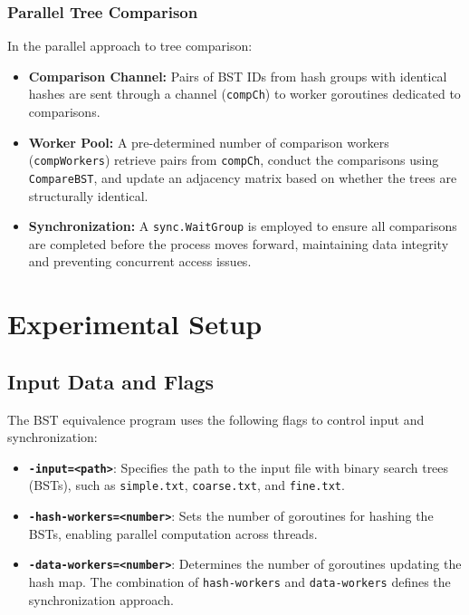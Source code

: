 \documentclass[letterpaper,12pt]{article}
\theoremstyle{remark}
\begin{document}
\subsubsection{Parallel Tree Comparison}
In the parallel approach to tree comparison:
\begin{itemize}
    \item \textbf{Comparison Channel:} Pairs of BST IDs from hash groups with identical hashes are sent through a channel (\texttt{compCh}) to worker goroutines dedicated to comparisons.
    \item \textbf{Worker Pool:} A pre-determined number of comparison workers (\texttt{compWorkers}) retrieve pairs from \texttt{compCh}, conduct the comparisons using \texttt{CompareBST}, and update an adjacency matrix based on whether the trees are structurally identical.
    \item \textbf{Synchronization:} A \texttt{sync.WaitGroup} is employed to ensure all comparisons are completed before the process moves forward, maintaining data integrity and preventing concurrent access issues.

\end{itemize}





\section*{Experimental Setup}
\subsection{Input Data and Flags}
The BST equivalence program uses the following flags to control input and synchronization:

\begin{itemize}
    \item \textbf{\texttt{-input=<path>}}: Specifies the path to the input file with binary search trees (BSTs), such as \texttt{simple.txt}, \texttt{coarse.txt}, and \texttt{fine.txt}.
    
    \item \textbf{\texttt{-hash-workers=<number>}}: Sets the number of goroutines for hashing the BSTs, enabling parallel computation across threads.

    \item \textbf{\texttt{-data-workers=<number>}}: Determines the number of goroutines updating the hash map. The combination of \texttt{hash-workers} and \texttt{data-workers} defines the synchronization approach.
\end{itemize}
\end{document}
